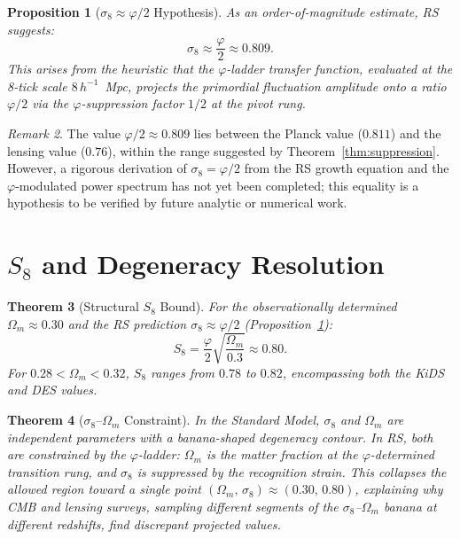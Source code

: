 \documentclass[12pt,a4paper]{article}
\newtheorem{theorem}{Theorem}[section]
\newtheorem{proposition}[theorem]{Proposition}
\theoremstyle{definition}
\theoremstyle{remark}
\newtheorem{remark}[theorem]{Remark}
\begin{document}
\begin{proposition}[$\sigma_8 \approx \varphi/2$ Hypothesis]
\label{prop:phi2}
As an order-of-magnitude estimate, RS suggests:
\begin{equation}
  \sigma_8 \approx \frac{\varphi}{2} \approx 0.809.
\end{equation}
This arises from the heuristic that the $\varphi$-ladder transfer
function, evaluated at the 8-tick scale $8\,h^{-1}$~Mpc, projects the
primordial fluctuation amplitude onto a ratio $\varphi/2$ via the
$\varphi$-suppression factor $1/2$ at the pivot rung.
\end{proposition}

\begin{remark}
The value $\varphi/2 \approx 0.809$ lies between the Planck value
($0.811$) and the lensing value ($0.76$), within the range suggested
by Theorem~\ref{thm:suppression}.  However, a rigorous derivation of
$\sigma_8 = \varphi/2$ from the RS growth equation and the
$\varphi$-modulated power spectrum has not yet been completed; this
equality is a hypothesis to be verified by future analytic or numerical
work.
\end{remark}

\section{$S_8$ and Degeneracy Resolution}
\label{sec:S8}

\begin{theorem}[Structural $S_8$ Bound]
\label{thm:S8}
For the observationally determined $\Omega_m \approx 0.30$ and the RS
prediction $\sigma_8 \approx \varphi/2$ (Proposition~\ref{prop:phi2}):
\begin{equation}
  S_8 = \frac{\varphi}{2}\sqrt{\frac{\Omega_m}{0.3}} \approx 0.80.
\end{equation}
For $0.28 < \Omega_m < 0.32$, $S_8$ ranges from $0.78$ to $0.82$,
encompassing both the KiDS and DES values.
\end{theorem}

\begin{theorem}[$\sigma_8$--$\Omega_m$ Constraint]
\label{thm:collapse}
In the Standard Model, $\sigma_8$ and $\Omega_m$ are independent
parameters with a banana-shaped degeneracy contour.  In RS, both are
constrained by the $\varphi$-ladder: $\Omega_m$ is the matter fraction
at the $\varphi$-determined transition rung, and $\sigma_8$ is
suppressed by the recognition strain.  This collapses the allowed
region toward a single point
$(\Omega_m,\,\sigma_8) \approx (0.30,\,0.80)$,
explaining why CMB and lensing surveys, sampling different segments of
the $\sigma_8$--$\Omega_m$ banana at different redshifts, find
discrepant projected values.
\end{theorem}
\end{document}
